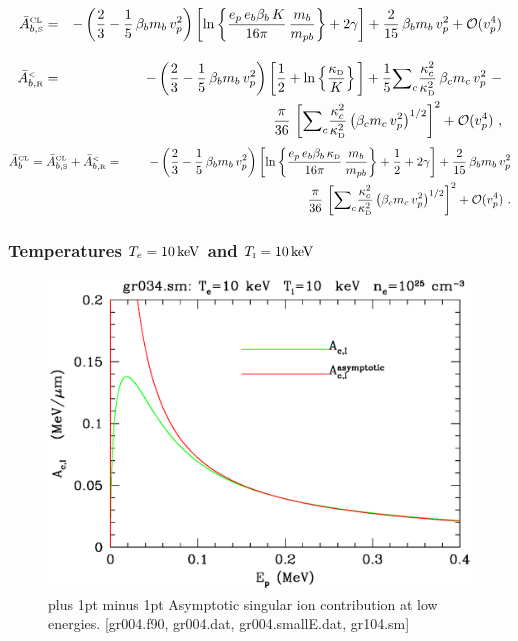 \documentclass[preprint,12pt,eqsecnum,nofootinbib,amsmath,amssymb]{revtex4}
\newcommand{\smI}{{\rm\scriptscriptstyle I}}
\newcommand{\smR}{{\rm\scriptscriptstyle R}}
\newcommand{\smS}{{\rm\scriptscriptstyle S}}
\newcommand{\smD}{{\rm\scriptscriptstyle D}}
\newcommand{\smCL}{{\rm\scriptscriptstyle CL}}
\newcommand{\smLT}{{\rm\scriptscriptstyle <}}
\newcommand{\footnoteskip}{\baselineskip 12pt plus 1pt minus 1pt}
\begin{document}
\begin{eqnarray}
  \bar A_{b,\smS}^\smCL
  &=&
  -\left(\frac{2}{3} - \frac{1}{5}\,\beta_b m_b\, v_p^2 \right)
  \left[\ln\left\{ \frac{e_p \,e_b \beta_b \, K}{16\pi}\,
  \frac{m_b}{m_{pb}}\right\} + 2 \gamma \right] 
  + 
  \frac{2}{15}\,\beta_b m_b \, v_p^2  
  +
  {\cal O}(v_p^4) 
\label{classvzero_sing_nlo}
\\[10pt]
\nonumber
  \bar A_{b,\smR}^\smLT
  &=&
  -\left(\frac{2}{3} - \frac{1}{5}\,\beta_b m_b\, v_p^2 \right)
  \left[ \frac{1}{2} + \ln\left\{\frac{\kappa_\smD}{K} \right\}\, \right]
  +
  \frac{1}{5}{\sum}_c \frac{\kappa_c^2}{\kappa_\smD^2} \,
  \beta_c m_c\, v_p^2 ~   -
\\
  && \hskip5cm 
  \frac{\pi}{36}\, \left[ {\sum}_c \frac{\kappa_c^2}{\kappa_\smD^2} 
  \left( \beta_c m_c\,v_p^2\right)^{1/2} \right]^2
  + 
  {\cal O}(v_p^4) \ ,
\label{classvzero_reg_nlo}
\end{eqnarray}
\begin{eqnarray}
\nonumber
  \bar A_b^\smCL
  =
  \bar A_{b,\smS}^\smCL
  +
  \bar A_{b,\smR}^\smLT
  &=&
  -\left(\frac{2}{3} - \frac{1}{5}\,\beta_b m_b\, v_p^2 \right)
  \left[\ln\left\{ \frac{e_p \,e_b \beta_b \, \kappa_\smD}{16\pi}\,
  \frac{m_b}{m_{pb}}\right\} + \frac{1}{2} + 2 \gamma \right] 
  + 
  \frac{2}{15}\,\beta_b m_b \, v_p^2  
\\
  && \hskip5cm 
  \frac{\pi}{36}\, \left[ {\sum}_c \frac{\kappa_c^2}{\kappa_\smD^2} 
  \left( \beta_c m_c\,v_p^2\right)^{1/2} \right]^2
  + 
  {\cal O}(v_p^4) \ .
\nonumber
\\
\end{eqnarray}


\pagebreak

\subsubsection{Temperatures $T_e=10\,{\rm keV}$ and $T_\smI=10\,{\rm keV}$}

\vskip-2cm 
\begin{figure}[h!]
\includegraphics[scale=0.45]{gr034.eps} 
\vskip-0.8cm 
\caption{\footnoteskip  
  Asymptotic singular ion contribution at low energies. 
  [gr004.f90, gr004.dat, gr004.smallE.dat, gr104.sm]
}
\end{figure}
\end{document}
